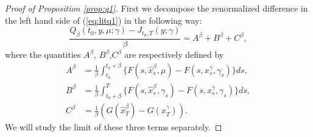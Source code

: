 \documentclass[12pt,reqno]{amsart}
\numberwithin{equation}{section}  %
\newcommand{\1}{{\bf 1}}
\newcommand{\2}{{\bf 2}}
\newcommand{\ga}{\gamma}
\newcommand{\lp}{\left(}
\newcommand{\rp}{\right)}
\theoremstyle{remark}
\theoremstyle{remark}
\begin{document}
\begin{proof}[Proof of Proposition \ref{prop:q1}]
First we decompose the renormalized difference in the left hand side of (\ref{eq:litq1}) in the following way:
   \begin{equation}\label{eq: decomp-ABC}
   \frac{Q_{\beta}(t_0,y,\mu;\ga)-J_{t_0,T}(y;\ga)}{\beta}= A^{\beta} +B^{\beta} +C^{\beta},
   \end{equation}
   where the quantities $A^{\beta}$, $B^{\beta}$,$C^{\beta}$ are respectively defined by
   \begin{align}
       A^{\beta}&=\frac{1}{\beta}\int_{t_0}^{t_0+\beta}\{F(s,\hat{x}_{s}^{\beta},\mu)-F(s,x_{s}^{\ga},\ga_{s})\}ds, \label{eq: decomp-A}\\
       B^{\beta}&=\frac{1}{\beta}\int_{t_0+\beta}^{T}\{F(s,\hat{x}_{s}^{\beta},\ga_{s})-F(s,x_{s}^{\ga},\ga_{s})\}ds,\label{eq: decomp-B}\\
       C^{\beta}&=\frac{1}{\beta}\lp G(\hat{x}_{T}^{\beta})-G(x_{T}^{\ga})\rp\label{eq: decomp-C}.
   \end{align}
   We will study the limit of these three terms separately.
       

\end{proof}
\end{document}
